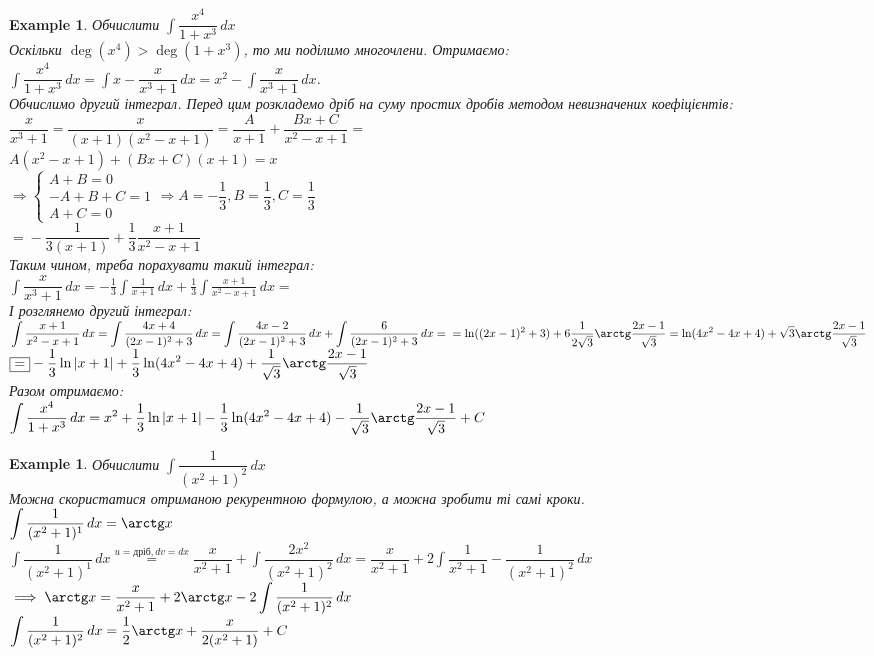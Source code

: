\documentclass[a4paper, 10pt]{article}
\def\huge{\displaystyle}
\theoremstyle{theoremdd}
\theoremstyle{theoremdd}
\theoremstyle{theoremdd}
\theoremstyle{theoremdd}
\theoremstyle{theoremdd}
\newtheorem{example}[theorem]{Example}
\theoremstyle{theoremdd}
\theoremstyle{theoremdd}
\theoremstyle{theoremdd}
\theoremstyle{theoremdd}
\begin{document}
\begin{example}
Обчислити $\huge \int \dfrac{x^4}{1+x^3}\,dx$\\
Оскільки $\deg(x^4) > \deg(1+x^3)$, то ми поділимо многочлени. Отримаємо:\\
$\huge \int \dfrac{x^4}{1+x^3}\,dx = \int x - \dfrac{x}{x^3+1}\,dx = x^2 - \int \dfrac{x}{x^3+1}\,dx$.\\
Обчислимо другий інтеграл. Перед цим розкладемо дріб на суму простих дробів методом невизначених коефіцієнтів:\\
$\dfrac{x}{x^3+1} = \dfrac{x}{(x+1)(x^2-x+1)} = \dfrac{A}{x+1} + \dfrac{Bx+C}{x^2-x+1} \boxed{=}$\\
$A(x^2-x+1) + (Bx+C)(x+1) = x$\\
$\Rightarrow \begin{cases}
A + B = 0 \\
-A + B + C = 1\\
A + C = 0
\end{cases} \Rightarrow A = -\dfrac{1}{3}, B = \dfrac{1}{3}, C = \dfrac{1}{3}$\\
$\boxed{=} -\dfrac{1}{3(x+1)} + \dfrac{1}{3} \dfrac{x+1}{x^2-x+1}$\\
Таким чином, треба порахувати такий інтеграл:\\
$\huge \int \dfrac{x}{x^3+1}\,dx = -\frac{1}{3} \int \frac{1}{x+1}\,dx + \frac{1}{3} \int \frac{x+1}{x^2-x+1}\,dx \boxed{=}$\\
І розглянемо другий інтеграл:\\
$\huge \int \frac{x+1}{x^2-x+1}\,dx = \int \frac{4x+4}{(2x-1)^2 + 3}\,dx = \int \frac{4x-2}{(2x-1)^2 +3}\,dx + \int \frac{6}{(2x-1)^2 +3}\,dx = \\ = \ln((2x-1)^2+3) + 6 \dfrac{1}{2\sqrt{3}} \arctg \dfrac{2x-1}{\sqrt{3}} = \ln(4x^2-4x+4) + \sqrt{3} \arctg \dfrac{2x-1}{\sqrt{3}}$\\
$\boxed{=} \huge -\dfrac{1}{3} \ln|x+1| + \dfrac{1}{3} \ln(4x^2-4x+4) + \dfrac{1}{\sqrt{3}} \arctg \dfrac{2x-1}{\sqrt{3}}$\\
Разом отримаємо:\\
$\huge \int \dfrac{x^4}{1+x^3}\,dx = x^2 + \dfrac{1}{3} \ln|x+1| - \dfrac{1}{3} \ln(4x^2-4x+4) - \dfrac{1}{\sqrt{3}} \arctg \dfrac{2x-1}{\sqrt{3}} + C$
\end{example}

\begin{example}
Обчислити $\huge\int \dfrac{1}{(x^2+1)^2}\,dx$\\
Можна скористатися отриманою рекурентною формулою, а можна зробити ті самі кроки.\\
$\huge \int \dfrac{1}{(x^2+1)^1}\,dx = \arctg x$\\
$\huge \int \dfrac{1}{(x^2+1)^1}\,dx \overset{u=\text{дріб}, dv = dx}{=} \dfrac{x}{x^2+1} + \int \dfrac{2x^2}{(x^2+1)^2}\,dx = \dfrac{x}{x^2+1} + 2\int \dfrac{1}{x^2+1} - \dfrac{1}{(x^2+1)^2}\,dx$\\
$\implies \huge \arctg x = \dfrac{x}{x^2+1} + 2\arctg x - 2 \int \dfrac{1}{(x^2+1)^2}\,dx$\\
$\huge\int \dfrac{1}{(x^2+1)^2}\,dx = \dfrac{1}{2} \arctg x + \dfrac{x}{2(x^2+1)} + C$
\end{example}
\end{document}
